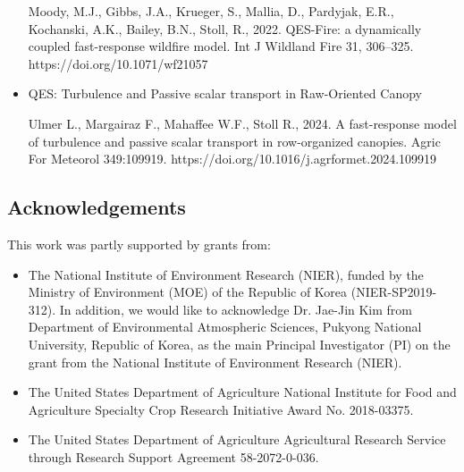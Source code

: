 \begin{itemize}
Moody, M.J., Gibbs, J.A., Krueger, S., Mallia, D., Pardyjak, E.R., Kochanski, A.K., Bailey, B.N., Stoll, R., 2022. QES-Fire: a dynamically coupled fast-response wildfire model. Int J Wildland Fire 31, 306–325. https://doi.org/10.1071/wf21057

\item QES: Turbulence and Passive scalar transport in Raw-Oriented Canopy

Ulmer L., Margairaz F., Mahaffee W.F., Stoll R., 2024. A fast-response model of turbulence and passive scalar transport in row-organized canopies. Agric For Meteorol 349:109919. https://doi.org/10.1016/j.agrformet.2024.109919


\end{itemize}


\subsection{Acknowledgements}

This work was partly supported by grants from:

\begin{itemize}

\item The National Institute of Environment Research (NIER), funded by the Ministry of Environment (MOE) of the Republic of Korea (NIER-SP2019-312). In addition, we would like to acknowledge Dr. Jae-Jin Kim from Department of Environmental Atmospheric Sciences, Pukyong National University, Republic of Korea, as the main Principal Investigator (PI) on the grant from the National Institute of Environment Research (NIER).

\item The United States Department of Agriculture National Institute for Food and Agriculture Specialty Crop Research Initiative Award No. 2018-03375.

\item The United States Department of Agriculture Agricultural Research Service through Research Support Agreement 58-2072-0-036.

\end{itemize}
